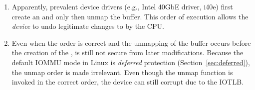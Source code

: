 \begin{enumerate}[label=(\roman*),wide, labelwidth=!, labelindent=0pt]

\item Apparently, prevalent device drivers (e.g., Intel 40GbE driver, i40e) first create an \skb{} and only then unmap the buffer. This order of execution allows the \emph{device} to undo legitimate changes to \shinfo{} by the CPU. 

\item Even when the order is correct and the unmapping of the buffer occurs before the creation of the \skb{},  \shinfo{} is still not secure from later modifications. Because the default IOMMU mode in Linux is \emph{deferred} protection (Section~\ref{sec:deferred}), the unmap order is made irrelevant. Even though the unmap function is invoked in the correct order, the device can still corrupt \shinfo{} due to the IOTLB.  


\end{enumerate}
